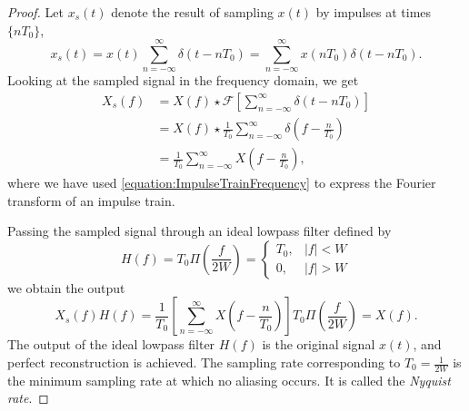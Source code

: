 \begin{proof}
Let $x_{s}(t)$ denote the result of sampling $x(t)$ by impulses at times $\{ nT_0 \}$,
\begin{equation*}
x_s(t) = x(t) \sum_{n=-\infty}^{\infty} \delta(t-nT_0)
= \sum_{n=-\infty}^{\infty} x(nT_0) \delta(t-nT_0).
\end{equation*}
Looking at the sampled signal in the frequency domain, we get
\begin{equation*}
\begin{split}
X_s(f) &= X(f) \star \mathcal{F} \left[ \sum_{n=-\infty}^{\infty} \delta(t-nT_0) \right] \\
&= X(f) \star \frac{1}{T_0} \sum_{n=-\infty}^{\infty} \delta \left( f-\frac{n}{T_0} \right) \\
&= \frac{1}{T_0} \sum_{n=-\infty}^{\infty} X \left( f - \frac{n}{T_0} \right) ,
\end{split}
\end{equation*}
where we have used \eqref{equation:ImpulseTrainFrequency} to express the Fourier transform of an impulse train.

Passing the sampled signal through an ideal lowpass filter defined by
\begin{equation*}
H(f) = T_0 \Pi \left( \frac{f}{2W} \right)
= \begin{cases} T_0, & |f| < W \\
0, & |f| > W \end{cases}
\end{equation*}
we obtain the output
\begin{equation*}
X_s(f) H(f)
= \frac{1}{T_0} \left[ \sum_{n=-\infty}^{\infty} X \left( f - \frac{n}{T_0} \right) \right]
T_0 \Pi \left( \frac{f}{2W} \right)
= X(f) .
\end{equation*}
The output of the ideal lowpass filter $H(f)$ is the original signal $x(t)$, and perfect reconstruction is achieved.
The sampling rate corresponding to $T_0 = \frac{1}{2W}$ is the minimum sampling rate at which no aliasing occurs.
It is called the \emph{Nyquist rate}.
\end{proof}

